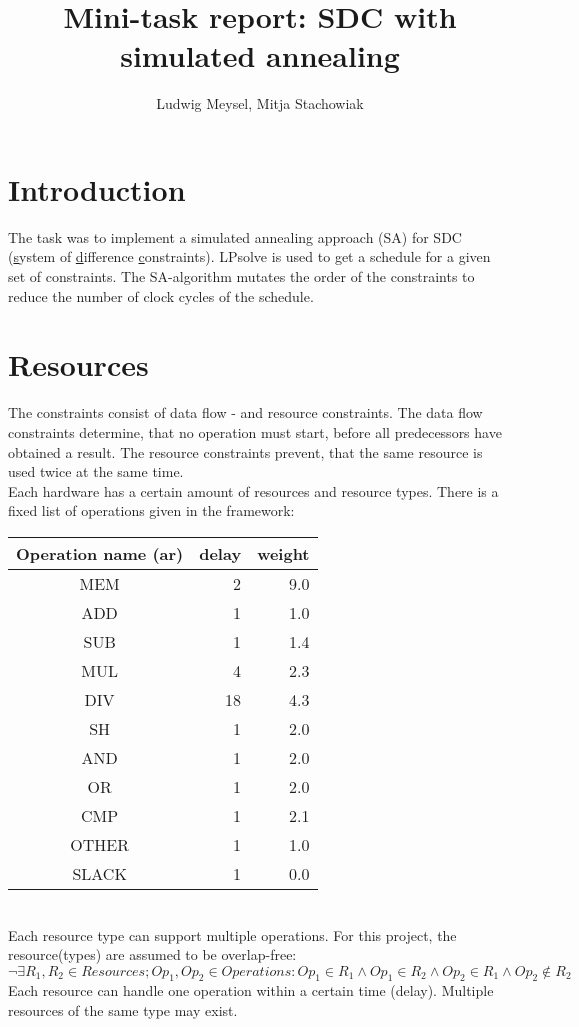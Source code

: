 \documentclass[colorback,accentcolor=tud1c,11pt]{tudreport}
\title{Mini-task report: SDC with simulated annealing}
\subtitle{Ludwig Meysel, Mitja Stachowiak}
\begin{document}
  \maketitle

  \chapter{Introduction}
  The task was to implement a simulated annealing approach (SA) for SDC (\underline{s}ystem of \underline{d}ifference \underline{c}onstraints). LPsolve is used to get a schedule for a given set of constraints. The SA-algorithm mutates the order of the constraints to reduce the number of clock cycles of the schedule.
  
  
  
  \chapter{Resources}
  The constraints consist of data flow - and resource constraints. The data flow constraints determine, that no operation must start, before all predecessors have obtained a result. The resource constraints prevent, that the same resource is used twice at the same time.\\
  Each hardware has a certain amount of resources and resource types. There is a fixed list of operations given in the framework:\\
  \begin{tabular}{ c | r | r }
  	Operation name (ar) & delay & weight \\
  	\hline
  	MEM   &  2 & 9.0 \\
  	ADD   &  1 & 1.0 \\
  	SUB   &  1 & 1.4 \\
  	MUL   &  4 & 2.3 \\
  	DIV   & 18 & 4.3 \\
  	SH    &  1 & 2.0 \\
  	AND   &  1 & 2.0 \\
  	OR    &  1 & 2.0 \\
  	CMP   &  1 & 2.1 \\
  	OTHER &  1 & 1.0 \\
  	SLACK &  1 & 0.0 \\
  \end{tabular}\\
  Each resource type can support multiple operations. For this project, the resource(types) are assumed to be overlap-free:
  $$\neg \exists R_1, R_2 \in Resources; Op_1, Op_2 \in Operations : Op_1 \in R_1 \land Op_1 \in R_2 \land Op_2 \in R_1 \land Op_2 \notin R_2$$
  Each resource can handle one operation within a certain time (delay). Multiple resources of the same type may exist.
  
\end{document}
